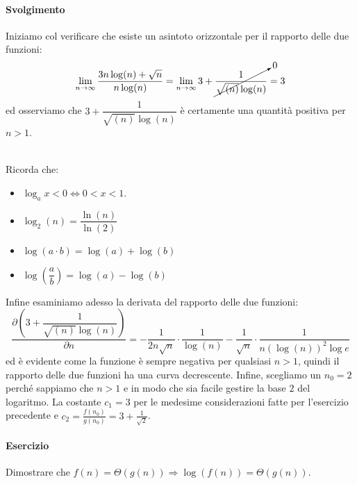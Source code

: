 \documentclass[11pt,a4paper,oneside]{article}
\begin{document}
\paragraph*{Svolgimento} Iniziamo col verificare che esiste un asintoto orizzontale per il rapporto delle due funzioni:
$$\lim_{n \to \infty} \dfrac{3n\log(n)+ \sqrt{n}}{n\log(n)} = \lim_{n \to \infty} 3 + \cancelto{0}{\dfrac{1}{\sqrt{(n)}\log(n)}}=3$$
ed osserviamo che $3 + \dfrac{1}{\sqrt{(n)}\log(n)}$ è certamente una quantità positiva per $n>1$.\\\\
\begin{tcolorbox}[title=Alcune proprietà dei logaritmi]
	\label{tbox:logs}
	Ricorda che:
	\begin{itemize}
		\item $\log_{a} x < 0 \Leftrightarrow 0 < x < 1$.
		\item $\log_2(n) = \dfrac{\ln(n)}{\ln(2)}$
		\item $\log(a \cdot b) = \log(a) + \log(b)$
		\item $\log\left(\dfrac{a}{b}\right) = \log(a) - \log(b)$
	\end{itemize}
\end{tcolorbox}
Infine esaminiamo adesso la derivata del rapporto delle due funzioni:
$$\dfrac{\partial \left(3 + \dfrac{1}{\sqrt{(n)}\log(n)} \right)}{\partial n} =-\frac{1}{2n\sqrt{n}}\cdot\frac{1}{\log(n)} - \frac{1}{\sqrt{n}} \cdot \frac{1}{n(\log(n))^2\log{e}} $$
ed è evidente come la funzione è sempre negativa per qualsiasi $n > 1$, quindi il rapporto delle due funzioni ha una curva decrescente.
Infine, scegliamo un $n_0 = 2$ perché sappiamo che $n > 1$ e in modo che sia facile gestire la base $2$ del logaritmo. La costante $c_1 = 3$ per le medesime considerazioni fatte per l'esercizio precedente e $c_2 = \frac{f(n_0)}{g(n_0)} = 3 + \frac{1}{\sqrt{2}}$.
\paragraph*{Esercizio} Dimostrare che $f(n) = \Theta(g(n)) \Rightarrow \log(f(n)) = \Theta(g(n))$.
\end{document}
